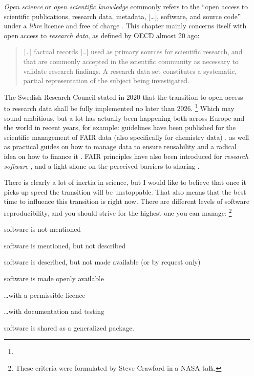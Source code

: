 \documentclass[draft,webedition,openright,titles,swedish,english]{LuaUUThesis}\usepackage[]{graphicx}\usepackage[]{xcolor}
\begin{document}
\emph{Open science} or \emph{open scientific knowledge} commonly refers to the
\enquote{open  access  to  scientific  publications, research  data,  metadata,
[\ldots], software, and source code} under a \emph{libre} licence and
free of charge \cite{KungligaBiblioteket2023,UNESCO2021}.
This chapter mainly concerns itself with open access to \emph{research data},
as defined by OECD \cite{OECD2007} almost \qty{20}{\years} ago:

\blockquote{%
   [\ldots] factual records [\ldots] used as primary sources for scientific research,
   and that are commonly accepted in the scientific community as necessary to validate
   research findings. A research data set constitutes a systematic, partial representation
   of the subject being investigated.}

The Swedish Research Council stated in 2020 that
the transition to open access to research data shall be fully implemented no later
than 2026.%
\footnote{}
Which may sound ambitious, but a lot has actually been happening both across Europe
and the world in recent years, for example:
guidelines have been published for the scientific management of FAIR data
(also specifically for chemistry data)
\cite{McEwen2023,Scheffler2022,Lamprecht2020,KungligaBiblioteket2019,Wilkinson2016},
as well as practical guides on how to manage data to ensure reusability \cite{Borgman2022}
and a radical idea on how to finance it \cite{Mons2020}.
FAIR principles have also been introduced for \emph{research software} \cite{Barker2022},
and a light shone on the perceived barriers to sharing \cite{Gomes2022}.

There is clearly a lot of inertia in science, but I would like to believe that
once it picks up speed the transition will be unstoppable.
That also means that the best time to influence this transition is right now.
There are different levels of software reproducibility, and you should strive for
the highest one you can manage:%
\footnote{These criteria were formulated by Steve Crawford  in a NASA talk.}
\begin{enumerate*}[label=(\roman*),itemjoin={{; }},itemjoin*={{; and }}]
   \item software is not mentioned
   \item software is mentioned, but not described
   \item software is described, but not made available (or by request only)
   \item software is made openly available
   \item \ldots with a permissible licence
   \item \ldots with documentation and testing
   \item software is shared as a generalized package.
\end{enumerate*}
\end{document}
